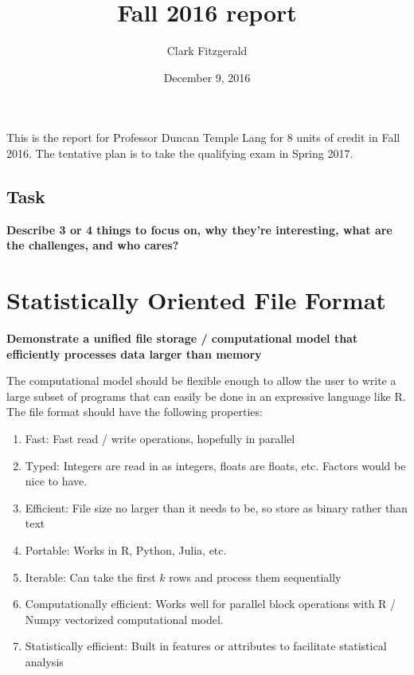 \documentclass[12pt]{article}
\begin{document}
\title{Fall 2016 report}
\date{December 9, 2016}
\author{Clark Fitzgerald}
\maketitle

This is the report for Professor Duncan Temple Lang for 8 units of
credit in Fall 2016.  The tentative plan is to take the qualifying exam in
Spring 2017.

\subsection*{Task}
\textbf{Describe 3 or 4 things to focus on, why they're interesting, what are the
challenges, and who cares?}


\section{Statistically Oriented File Format}

\textbf{Demonstrate a unified file storage / computational model
that efficiently processes data larger than memory}

The computational model should be flexible enough to allow the user to
write a large subset of programs that can easily be done in an expressive
language like R.  The file format should have the following properties:

\begin{enumerate}
    \item{Fast:} Fast read / write operations, hopefully in parallel
    \item{Typed:} Integers are read in as integers, floats are floats, etc.
        Factors would be nice to have.
    \item{Efficient:} File size no larger than it needs to be, so store as
        binary rather than text
    \item{Portable:} Works in R, Python, Julia, etc.
    \item{Iterable:} Can take the first $k$ rows and process them
        sequentially
    \item{Computationally efficient:} Works well for parallel block
        operations with R / Numpy vectorized computational model.
    \item{Statistically efficient:} Built in features or attributes to
        facilitate statistical analysis
\end{enumerate}
\end{document}
